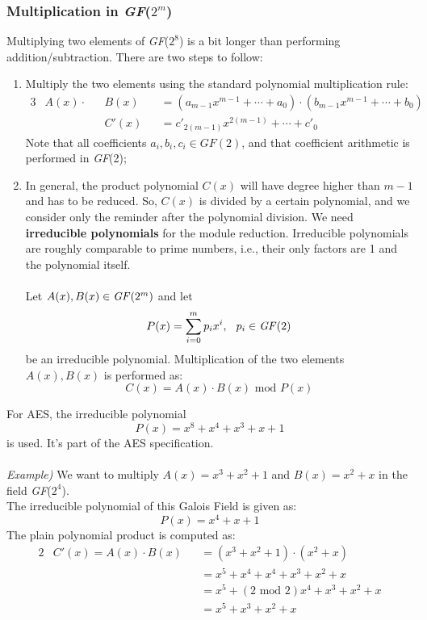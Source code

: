\documentclass[11pt, a4paper]{article}
\newcommand{\gf}[1]{\textit{GF}(#1)}
\newcommand{\mymod}{
    \text{ mod }
}
\begin{document}
\newpage
\hypertarget{multGF}{\subsubsection{Multiplication in \gf{$2^m$}}}
Multiplying two elements of \gf{$2^8$} is a bit longer than performing addition/subtraction. There are two steps to follow:
\begin{enumerate}
    \item Multiply the two elements using the standard polynomial multiplication rule:
    \begin{alignat*}{3}
        &A(x)\cdot &&B(x)&&=(a_{m-1}x^{m-1}+\cdots+a_0)\cdot(b_{m-1}x^{m-1}+\cdots+b_0)\\
        &          &&C'(x)&&=c'_{2(m-1)}x^{2(m-1)}+\cdots+c'_0
    \end{alignat*}
    Note that all coefficients $a_i,b_i,c_i\in\gf{2}$, and that coefficient arithmetic is performed in \gf{2};
    \item In general, the product polynomial $C(x)$ will have degree higher than $m-1$ and has to be reduced. So, $C(x)$ is divided by a certain polynomial, and we consider only the reminder after the polynomial division. We need \textbf{irreducible polynomials} for the module reduction. Irreducible polynomials are roughly comparable to prime numbers, i.e., their only factors are 1 and the polynomial itself.\\\\
    Let $A(x),B(x)\in\text{\gf{$2^m$}}$ and let
    $$P(x)=\displaystyle\sum_{i=0}^mp_ix^i,\hspace{0.25cm}p_i\in\text{\gf{2}}$$
    be an irreducible polynomial. Multiplication of the two elements $A(x),B(x)$ is performed as:
    $$C(x)=A(x)\cdot B(x)\mymod P(x)$$
\end{enumerate}
For AES, the irreducible polynomial
$$P(x)=x^8+x^4+x^3+x+1$$
is used. It's part of the AES specification.\\\\
\textit{Example)} We want to multiply $A(x)=x^3+x^2+1$ and $B(x)=x^2+x$ in the field \gf{$2^4$}.\\
The irreducible polynomial of this Galois Field is given as:
$$P(x)=x^4+x+1$$
The plain polynomial product is computed as:
\begin{alignat*}{2}
    &C'(x)=A(x)\cdot B(x)&&=(x^3+x^2+1)\cdot(x^2+x)\\
    &                    &&=x^5+x^4+x^4+x^3+x^2+x\\
    &                    &&=x^5+(2\mymod2)x^4+x^3+x^2+x\\
    &                    &&=x^5+x^3+x^2+x
\end{alignat*}
\end{document}
